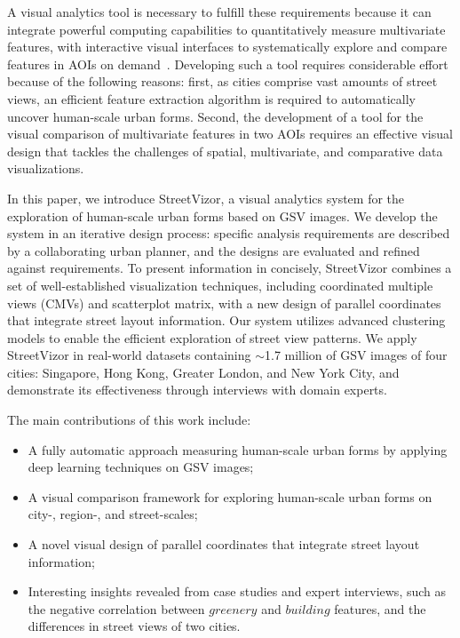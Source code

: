 A visual analytics tool is necessary to fulfill these requirements because it can integrate powerful computing capabilities to quantitatively measure multivariate features, with interactive visual interfaces to systematically explore and compare features in AOIs on demand~\cite{sun_2013_survey}.
Developing such a tool requires considerable effort because of the following reasons:
first, as cities comprise vast amounts of street views, an efficient feature extraction algorithm is required to automatically uncover human-scale urban forms.
Second, the development of a tool for the visual comparison of multivariate features in two AOIs requires an effective visual design that tackles the challenges of spatial, multivariate, and comparative data visualizations.

In this paper, we introduce StreetVizor, a visual analytics system for the exploration of human-scale urban forms based on GSV images.
We develop the system in an iterative design process: specific analysis requirements are described by a collaborating urban planner, and the designs are evaluated and refined against requirements.  
To present information in concisely, StreetVizor combines a set of well-established visualization techniques, including coordinated multiple views (CMVs) and scatterplot matrix, with a new design of parallel coordinates that integrate street layout information.
Our system utilizes advanced clustering models to enable the efficient exploration of street view patterns.
We apply StreetVizor in real-world datasets containing $\sim$1.7 million of GSV images of four cities: Singapore, Hong Kong, Greater London, and New York City, and demonstrate its effectiveness through interviews with domain experts. 

\vspace*{2mm}
The main contributions of this work include:

\begin{itemize}
	
\vspace*{-1.5mm}
\item
A fully automatic approach measuring human-scale urban forms by applying deep learning techniques on GSV images;
	
\vspace*{-1.5mm}
\item
A visual comparison framework for exploring human-scale urban forms on city-, region-, and street-scales;
	
\vspace*{-1.5mm}
\item
A novel visual design of parallel coordinates that integrate street layout information;
	
\vspace*{-1.5mm}
\item
Interesting insights revealed from case studies and expert interviews, such as the negative correlation between $greenery$ and $building$ features, and the differences in street views of two cities.
		
\end{itemize}